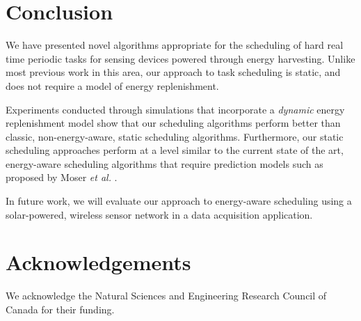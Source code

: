 \section{Conclusion} \label{sec:conclusion}

We have presented novel algorithms appropriate for the scheduling of hard real time periodic tasks 
for sensing devices powered through energy harvesting.  
Unlike most previous work in this area, our approach to task scheduling is static, 
and does not require a model of energy replenishment. 

Experiments conducted through simulations that incorporate a \emph{dynamic} energy replenishment model 
show that our scheduling algorithms perform better than classic, 
non-energy-aware, static scheduling algorithms. 
Furthermore, our static scheduling approaches perform at a level similar to the current state of the art, 
energy-aware scheduling algorithms that require prediction models such as proposed by Moser \emph{et al.} \cite{moser2007real}.  

In future work, we will evaluate our approach to energy-aware scheduling using a solar-powered, wireless sensor 
network in a data acquisition application. 

\section*{Acknowledgements}

We acknowledge the Natural Sciences and Engineering Research Council of Canada for their funding. 

